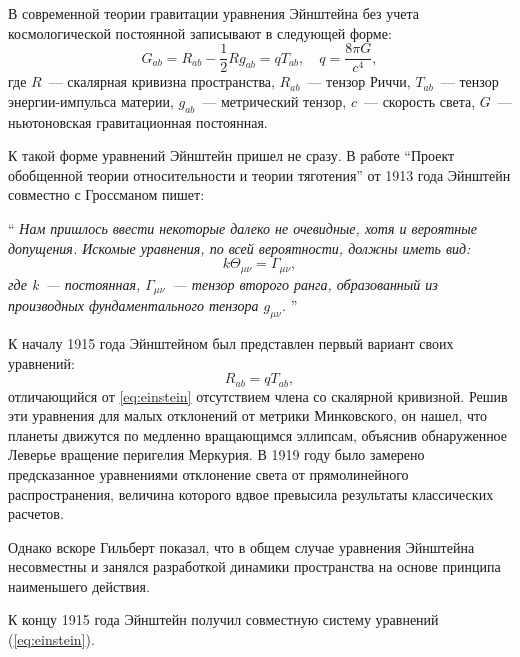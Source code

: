 \documentclass[\docroot/reports/draft/report.tex]{subfiles}
\begin{document}
    В современной теории гравитации уравнения Эйнштейна без учета космологической постоянной записывают в следующей форме:
    \begin{equation}\label{eq:einstein}
        G_{ab} = R_{ab} - \frac{1}{2} R g_{ab} = q T_{ab}, \quad
        q = \frac{8 \pi G}{c^4},
    \end{equation}
    где $R$~--- скалярная кривизна пространства, $R_{ab}$~--- тензор Риччи, $T_{ab}$~--- тензор энергии-импульса материи, $g_{ab}$~--- метрический тензор, $c$~--- скорость света, $G$~--- ньютоновская гравитационная постоянная.

    К такой форме уравнений Эйнштейн пришел не сразу. В работе \enquote{Проект обобщенной теории относительности и теории тяготения} \cite{einstein_grossman_grav_waves} от 1913 года Эйнштейн совместно с Гроссманом пишет:

    \enquote{\textit{%
        Нам пришлось ввести некоторые далеко не очевидные, хотя
        и вероятные допущения. Искомые уравнения, по всей вероятности, должны иметь вид:
        \begin{equation*}
            k \Theta_{\mu\nu} = \Gamma_{\mu\nu},
        \end{equation*}
        где k~--- постоянная, $\Gamma_{\mu\nu}$~--- тензор второго ранга, образованный из производных фундаментального тензора $g_{\mu\nu}$.%
    }}

    К началу 1915 года Эйнштейном был представлен первый вариант своих уравнений:
    \begin{equation*}
        R_{ab} = q T_{ab},
    \end{equation*}
    отличающийся от \autoref{eq:einstein} отсутствием члена со скалярной кривизной. Решив эти уравнения для малых отклонений от метрики Минковского, он нашел, что планеты движутся по медленно вращающимся эллипсам, объяснив обнаруженное Леверье вращение перигелия Меркурия. В 1919 году было замерено предсказанное уравнениями отклонение света от прямолинейного распространения, величина которого вдвое превысила результаты классических расчетов.

    Однако вскоре Гильберт показал, что в общем случае уравнения Эйнштейна несовместны и занялся разработкой динамики пространства на основе принципа наименьшего действия.

    К концу 1915 года Эйнштейн получил совместную систему уравнений (\autoref{eq:einstein}).
\end{document}
